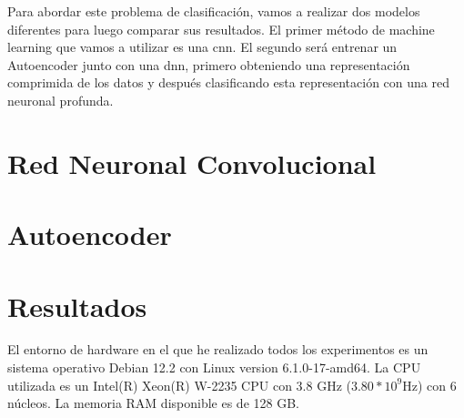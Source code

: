  


Para abordar este problema de clasificación, vamos a realizar dos modelos diferentes para luego comparar sus resultados. El primer método de machine learning que vamos a utilizar es una \acrfull{cnn}. El segundo será entrenar un Autoencoder junto con una \acrfull{dnn}, primero obteniendo una representación comprimida de los datos y después clasificando esta representación con una red neuronal profunda. 
 







\section{Red Neuronal Convolucional}
\section{Autoencoder}
\section{Resultados}
El entorno de hardware en el que he realizado todos los experimentos es un sistema operativo Debian 12.2 con Linux version 6.1.0-17-amd64. La CPU utilizada es un Intel(R) Xeon(R) W-2235 CPU con 3.8 GHz ($3.80*10^9$Hz) con 6 núcleos. La memoria RAM disponible es de 128 GB. 

















